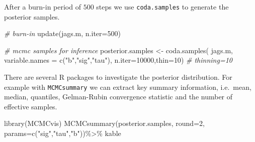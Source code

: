 \documentclass[
]{book}
\newenvironment{Shaded}{\begin{snugshade}}{\end{snugshade}}
\newcommand{\AttributeTok}[1]{\textcolor[rgb]{0.77,0.63,0.00}{#1}}
\newcommand{\CommentTok}[1]{\textcolor[rgb]{0.56,0.35,0.01}{\textit{#1}}}
\newcommand{\DecValTok}[1]{\textcolor[rgb]{0.00,0.00,0.81}{#1}}
\newcommand{\FunctionTok}[1]{\textcolor[rgb]{0.00,0.00,0.00}{#1}}
\newcommand{\NormalTok}[1]{#1}
\newcommand{\OtherTok}[1]{\textcolor[rgb]{0.56,0.35,0.01}{#1}}
\newcommand{\SpecialCharTok}[1]{\textcolor[rgb]{0.00,0.00,0.00}{#1}}
\newcommand{\StringTok}[1]{\textcolor[rgb]{0.31,0.60,0.02}{#1}}
\begin{document}
After a burn-in period of \(500\) steps we use \texttt{coda.samples} to generate the posterior samples.

\begin{Shaded}
\begin{Highlighting}[]
\CommentTok{\# burn{-}in}
\FunctionTok{update}\NormalTok{(jags.m, }\AttributeTok{n.iter=}\DecValTok{500}\NormalTok{) }

\CommentTok{\# mcmc samples for inference}
\NormalTok{posterior.samples }\OtherTok{\textless{}{-}} \FunctionTok{coda.samples}\NormalTok{( jags.m,}
                                   \AttributeTok{variable.names =} \FunctionTok{c}\NormalTok{(}\StringTok{"b"}\NormalTok{,}\StringTok{"sig"}\NormalTok{,}\StringTok{"tau"}\NormalTok{), }
                                   \AttributeTok{n.iter=}\DecValTok{10000}\NormalTok{,}\AttributeTok{thin=}\DecValTok{10}\NormalTok{) }\CommentTok{\# thinning=10 }
\end{Highlighting}
\end{Shaded}

There are several R packages to investigate the posterior distribution. For example with \texttt{MCMCsummary} we can extract key summary information, i.e.~mean, median, quantiles, Gelman-Rubin convergence statistic and the number of effective samples.

\begin{Shaded}
\begin{Highlighting}[]
\FunctionTok{library}\NormalTok{(MCMCvis)}
\FunctionTok{MCMCsummary}\NormalTok{(posterior.samples,}
            \AttributeTok{round=}\DecValTok{2}\NormalTok{,}
            \AttributeTok{params=}\FunctionTok{c}\NormalTok{(}\StringTok{"sig"}\NormalTok{,}\StringTok{"tau"}\NormalTok{,}\StringTok{"b"}\NormalTok{))}\SpecialCharTok{\%\textgreater{}\%}
\NormalTok{  kable}
\end{Highlighting}
\end{Shaded}
\end{document}
